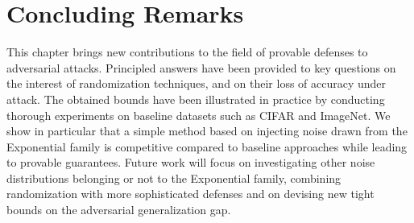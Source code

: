 \section{Concluding Remarks}
\label{section:ap3-conclusion_remarks}

This chapter brings new contributions to the field of provable defenses to adversarial attacks.
Principled answers have been provided to key questions on the interest of randomization techniques, and on their loss of accuracy under attack.
The obtained bounds have been illustrated in practice by conducting thorough experiments on baseline datasets such as CIFAR and ImageNet.
We show in particular that a simple method based on injecting noise drawn from the Exponential family is competitive compared to baseline approaches while leading to provable guarantees.
Future work will focus on investigating other noise distributions belonging or not to the Exponential family, combining randomization with more sophisticated defenses and on devising new tight bounds on the adversarial generalization gap.



